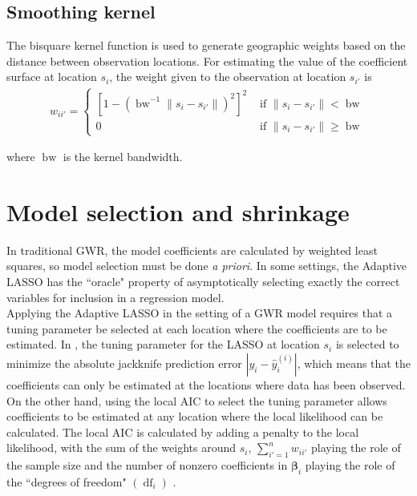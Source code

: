 \documentclass[authoryear, review, 11pt]{elsarticle}
\DeclareMathOperator*{\bw}{\mbox{bw}}
\DeclareMathOperator*{\df}{\mbox{df}}
\begin{document}
	 
	 \subsection{Smoothing kernel}
	 	The bisquare kernel function is used to generate geographic weights based on the distance between observation locations. For estimating the value of the coefficient surface at location $s_i$, the weight given to the observation at location $s_{i'}$ is	
	\begin{eqnarray}
		w_{ii'} = \begin{cases} \left[ 1-\left( \bw^{-1} \|s_i-s_{i'}\| \right)^2 \right]^2 & \mbox{ if } \|s_i-s_{i'}\| < \bw \\ 0 & \mbox{ if } \|s_i-s_{i'}\| \geq \bw \end{cases}
	\end{eqnarray}
	
	where $\bw$ is the kernel bandwidth.\\
	
\section{Model selection and shrinkage \label{section:method}}
	In traditional GWR, the model coefficients are calculated by weighted least squares, so model selection must be done \emph{a priori}. In some settings, the Adaptive LASSO \citep{Zou:2006} has the ``oracle" property of asymptotically selecting exactly the correct variables for inclusion in a regression model.\\

	Applying the Adaptive LASSO in the setting of a GWR model requires that a tuning parameter be selected at each location where the coefficients are to be estimated. In \cite{Wheeler:2009}, the tuning parameter for the LASSO at location $s_i$ is selected to minimize the absolute jackknife prediction error $|y_i - \hat{y}_i^{(i)}|$, which means that the coefficients can only be estimated at the locations where data has been observed. On the other hand, using the local AIC to select the tuning parameter allows coefficients to be estimated at any location where the local likelihood can be calculated. The local AIC is calculated by adding a penalty to the local likelihood, with the sum of the weights around $s_i$, $\sum_{i'=1}^n w_{ii'}$ playing the role of the sample size and the number of nonzero coefficients in $\bm{\beta}_i$ playing the role of the ``degrees of freedom" $\left( \df_i \right)$ \citep{Zou:2007}.\\
\end{document}
